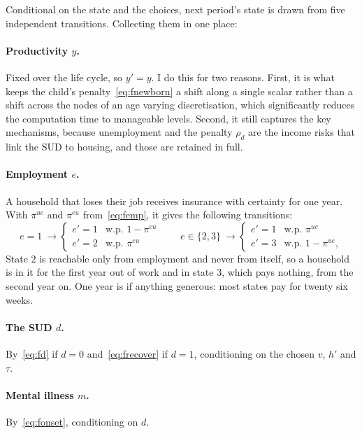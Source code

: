 \documentclass[10pt]{article}
\begin{document}
Conditional on the state and the choices, next period's state is drawn from five
independent transitions. Collecting them in one place:

\paragraph{Productivity $y$.} Fixed over the life cycle, so $y'=y$.
I do this for two reasons. First, it is what keeps the child's
penalty~\eqref{eq:fnewborn} a shift
along a single scalar rather than a shift across the nodes of an age varying
discretisation, which significantly reduces the computation time to
manageable levels. Second, it still captures the key mechanisms, because
unemployment and the penalty $\rho_d$ are the income risks that link the SUD to
housing, and those are retained in full.

\paragraph{Employment $e$.} A household that loses their job receives insurance
with certainty for one year. With $\pi^{ue}$ and $\pi^{eu}$
from~\eqref{eq:femp}, it gives the following transitions:
\begin{equation}\label{eq:fetrans}
e=1\ \longrightarrow
\begin{cases}
e'=1 & \text{w.p. } 1-\pi^{eu}\\
e'=2 & \text{w.p. } \pi^{eu}
\end{cases}
\qquad
e\in\{2,3\}\ \longrightarrow
\begin{cases}
e'=1 & \text{w.p. } \pi^{ue}\\
e'=3 & \text{w.p. } 1-\pi^{ue},
\end{cases}
\end{equation}
State $2$ is reachable only from employment and never from itself, so a
household is in it for the
first year out of work and in state $3$, which pays nothing, from the second year
on. One year is if anything generous: most states pay for twenty six weeks.

\paragraph{The SUD $d$.} By~\eqref{eq:fd} if $d=0$ and~\eqref{eq:frecover}
if $d=1$, conditioning on the chosen $v$, $h'$ and $\tau$.

\paragraph{Mental illness $m$.} By~\eqref{eq:fonset}, conditioning on $d$.
\end{document}
